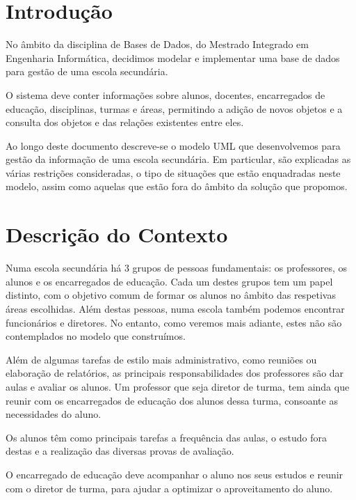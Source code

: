 \documentclass[12pt,a4paper,reqno]{report}
\numberwithin{figure}{section}
\numberwithin{equation}{section}
\begin{document}


\tableofcontents

\chapter{Introdução}

No âmbito da disciplina de Bases de Dados, do Mestrado Integrado em Engenharia Informática, decidimos modelar e implementar uma base de dados para gestão de uma escola secundária.

O sistema deve conter informações sobre alunos, docentes, encarregados de educação, disciplinas, turmas e áreas, permitindo a adição de novos objetos e a consulta dos objetos e das relações existentes entre eles.

Ao longo deste documento descreve-se o modelo UML que desenvolvemos para gestão da informação de uma escola secundária. Em particular, são explicadas as várias restrições consideradas, o tipo de situações que estão enquadradas neste modelo, assim como aquelas que estão fora do âmbito da solução que propomos.

\chapter{Descrição do Contexto}

Numa escola secundária há 3 grupos de pessoas fundamentais: os professores, os alunos e os encarregados de educação. Cada um destes grupos tem um papel distinto, com o objetivo comum de formar os alunos no âmbito das respetivas áreas escolhidas. Além destas pessoas, numa escola também podemos encontrar funcionários e diretores. No entanto, como veremos mais adiante, estes não são contemplados no modelo que construímos.

Além de algumas tarefas de estilo mais administrativo, como reuniões ou elaboração de relatórios, as principais responsabilidades dos professores são dar aulas e avaliar os alunos. Um professor que seja diretor de turma, tem ainda que reunir com os encarregados de educação dos alunos dessa turma, consoante as necessidades do aluno.

Os alunos têm como principais tarefas a frequência das aulas, o estudo fora destas e a realização das diversas provas de avaliação.

O encarregado de educação deve acompanhar o aluno nos seus estudos e reunir com o diretor de turma, para ajudar a optimizar o aproveitamento do aluno.
\end{document}
